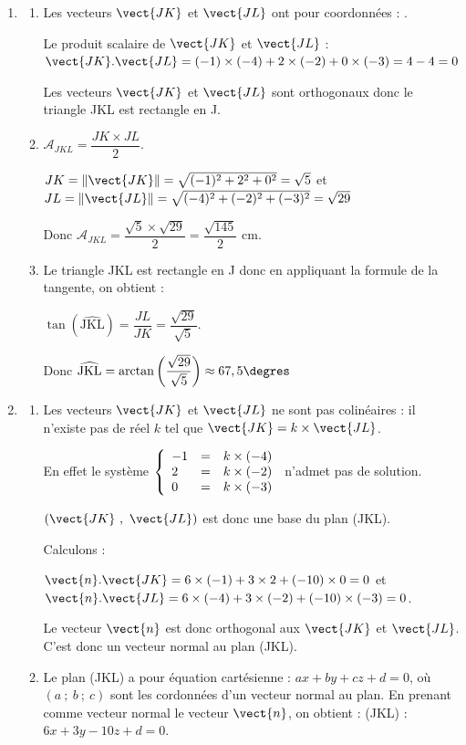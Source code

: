 
\bigskip

\begin{enumerate}
	\item 
	\begin{enumerate}
		\item Les vecteurs $\vect{JK}$ et $\vect{JL}$ ont pour coordonnées :  \quad {}.

Le produit scalaire de  $\vect{JK}$ et $\vect{JL}$ : $\vect{JK}.\vect{JL}=(-1)\times(-4)+2\times (-2)+0\times (-3)=4-4=0$

Les vecteurs $\vect{JK}$ et $\vect{JL}$ sont orthogonaux donc le triangle JKL est rectangle en J.
		\item $\mathcal{A}_{JKL}=\dfrac{JK\times JL}{2}$.

		$JK= \left\|\vect{JK}\right\| =\sqrt{(-1)^2+2^2+0^2}=\sqrt{5}$ et $JL=\left\|\vect{JL}\right\|=\sqrt{(-4)^2+(-2)^2+(-3)^2}=\sqrt{29}$

Donc $\mathcal{A}_{JKL}=\dfrac{\sqrt{5}\times \sqrt{29}}{2}=\dfrac{\sqrt{145}}{2}$ cm.
		\item Le triangle JKL est rectangle en J donc en appliquant la formule de la tangente, on obtient :

		$\tan \left(\widehat{\text{JKL}}\right)=\dfrac{JL}{JK}=\dfrac{\sqrt{29}}{\sqrt{5}}$.

Donc $\widehat{\text{JKL}}=\arctan\left(\dfrac{\sqrt{29}}{\sqrt{5}}\right)\approx 67,5\degres$
	\end{enumerate}

	\item
	\begin{enumerate}
\item Les vecteurs $\vect{JK}$ et $\vect{JL}$ ne sont pas colinéaires : il n'existe pas de réel $k$ tel que $\vect{JK}=k\times \vect{JL}$.

En effet le système $\left\{\begin{array}{l c l} -1&=&k\times (-4)\\2 &=& k\times (-2)\\0&=& k\times (-3) \end{array}\right.$ n'admet pas de solution.

$\left(\vect{JK}~,~\vect{JL}\right)$ est donc une base du plan (JKL).

Calculons :

$\vect{n}.\vect{JK}=6\times(-1)+3\times 2+(-10)\times 0=0$ et $\vect{n}.\vect{JL}=6\times(-4)+3\times (-2)+(-10)\times (-3)=0$.

Le vecteur $\vect{n}$ est donc orthogonal aux $\vect{JK}$ et $\vect{JL}$. C'est donc un vecteur normal au plan (JKL).
		\item Le plan (JKL) a pour équation cartésienne : $ax+by+cz+d=0$, où $(a~;~b~;~c)$ sont les cordonnées d'un vecteur normal au plan. En prenant comme vecteur normal le vecteur $\vect{n}$, on obtient : (JKL) : $6x + 3y - 10z + d = 0$. 


\end{enumerate}
\end{enumerate}
